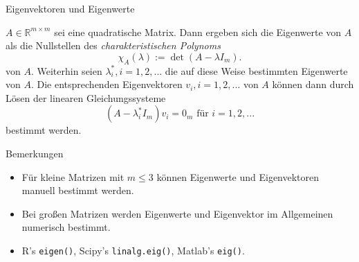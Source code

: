 \documentclass[
  8pt,
  ignorenonframetext,
]{beamer}
\providecommand{\tightlist}{%
  \setlength{\itemsep}{0pt}\setlength{\parskip}{0pt}}
\begin{document}
\begin{frame}[fragile]{Eigenvektoren und Eigenwerte}
\protect\hypertarget{eigenvektoren-und-eigenwerte-3}{}
\small
\begin{theorem}
\normalfont
\justifying
$A \in \mathbb{R}^{m \times m}$ sei eine quadratische Matrix. Dann ergeben sich
die Eigenwerte von $A$ als die Nullstellen des \textit{charakteristischen Polynoms}
\begin{equation}
\chi_A(\lambda) := \det(A - \lambda I_m).
\end{equation}
von $A$. Weiterhin seien $\lambda_i^*, i = 1,2,...$ die auf diese Weise bestimmten
Eigenwerte von $A$. Die entsprechenden Eigenvektoren $v_i, i = 1,2,...$ von $A$
können dann durch Lösen der linearen Gleichungssysteme
\begin{equation}
(A - \lambda_i^* I_m)v_i = 0_m \mbox{ für } i = 1,2,...
\end{equation}
bestimmt werden.
\end{theorem}

\footnotesize

Bemerkungen

\begin{itemize}
\tightlist
\item
  Für kleine Matrizen mit \(m \le 3\) können Eigenwerte und
  Eigenvektoren manuell bestimmt werden.
\item
  Bei großen Matrizen werden Eigenwerte und Eigenvektor im Allgemeinen
  numerisch bestimmt.
\item
  R's \texttt{eigen()}, Scipy's \texttt{linalg.eig()}, Matlab's
  \texttt{eig()}.
\end{itemize}
\end{frame}
\end{document}
